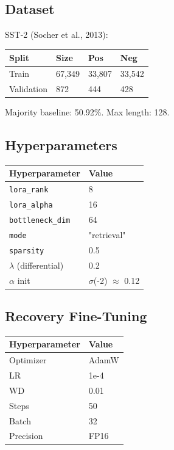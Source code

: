 \subsection{Dataset}

SST-2 (Socher et al., 2013):

\begin{table}[H]
\centering
\small
\begin{tabular}{llll}
\toprule
\textbf{Split} & \textbf{Size} & \textbf{Pos} & \textbf{Neg} \\
\midrule
Train & 67,349 & 33,807 & 33,542 \\
Validation & 872 & 444 & 428 \\
\bottomrule
\end{tabular}
\end{table}

Majority baseline: 50.92\%. Max length: 128.

\subsection{Hyperparameters}

\begin{table}[H]
\centering
\small
\begin{tabular}{ll}
\toprule
\textbf{Hyperparameter} & \textbf{Value} \\
\midrule
\texttt{lora\_rank} & 8 \\
\texttt{lora\_alpha} & 16 \\
\texttt{bottleneck\_dim} & 64 \\
\texttt{mode} & "retrieval" \\
\texttt{sparsity} & 0.5 \\
$\lambda$ (differential) & 0.2 \\
$\alpha$ init & $\sigma$(-2) $\approx$ 0.12 \\
\bottomrule
\end{tabular}
\end{table}

\subsection{Recovery Fine-Tuning}

\begin{table}[H]
\centering
\small
\begin{tabular}{ll}
\toprule
\textbf{Hyperparameter} & \textbf{Value} \\
\midrule
Optimizer & AdamW \\
LR & 1e-4 \\
WD & 0.01 \\
Steps & 50 \\
Batch & 32 \\
Precision & FP16 \\
\bottomrule
\end{tabular}
\end{table}

